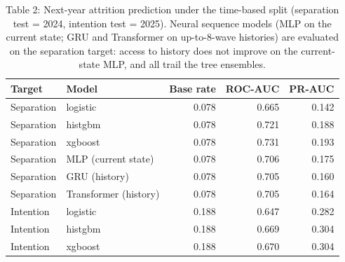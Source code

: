 \begin{table}
\caption{Table 2: Next-year attrition prediction under the time-based split (separation test = 2024, intention test = 2025). Neural sequence models (MLP on the current state; GRU and Transformer on up-to-8-wave histories) are evaluated on the separation target: access to history does not improve on the current-state MLP, and all trail the tree ensembles.}
\label{tab:table2_prediction}
\begin{tabular}{llrrr}
\toprule
Target & Model & Base rate & ROC-AUC & PR-AUC \\
\midrule
Separation & logistic & 0.078 & 0.665 & 0.142 \\
Separation & histgbm & 0.078 & 0.721 & 0.188 \\
Separation & xgboost & 0.078 & 0.731 & 0.193 \\
Separation & MLP (current state) & 0.078 & 0.706 & 0.175 \\
Separation & GRU (history) & 0.078 & 0.705 & 0.160 \\
Separation & Transformer (history) & 0.078 & 0.705 & 0.164 \\
Intention & logistic & 0.188 & 0.647 & 0.282 \\
Intention & histgbm & 0.188 & 0.669 & 0.304 \\
Intention & xgboost & 0.188 & 0.670 & 0.304 \\
\bottomrule
\end{tabular}
\end{table}
